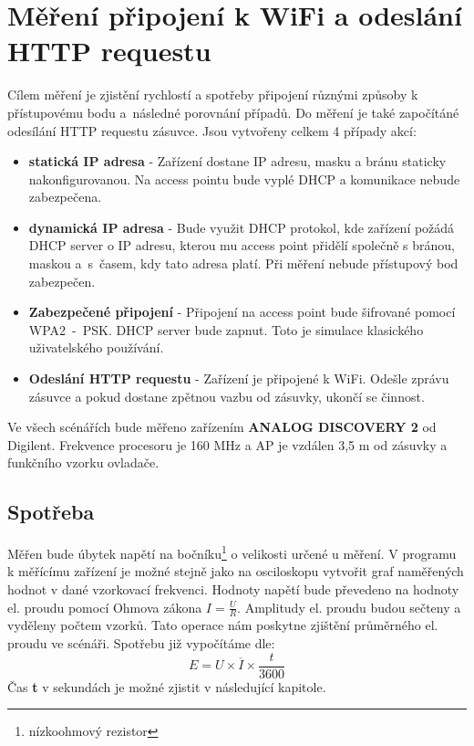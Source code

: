 \documentclass[a4paper, 12pt]{report}
\begin{document}
    \section{Měření připojení k WiFi a odeslání HTTP requestu}
    \label{sec:wifi}
    Cílem měření je zjistění rychlostí a spotřeby připojení různými způsoby k přístupovému bodu a~následné porovnání případů.
    Do měření je také započítáné odesílání HTTP requestu zásuvce.
    Jsou vytvořeny celkem 4 případy akcí:
    \begin{itemize}
        \item \textbf{statická IP adresa} - Zařízení dostane IP adresu, masku a bránu staticky nakonfigurovanou.
        Na access pointu bude vyplé DHCP a komunikace nebude zabezpečena.
        \item \textbf{dynamická IP adresa} - Bude využit DHCP protokol, kde zařízení požádá DHCP server o IP adresu, kterou mu access point přidělí společně s bránou, maskou a~s~časem, kdy tato adresa platí.
        Při měření nebude přístupový bod zabezpečen.
        \item \textbf{Zabezpečené připojení} - Připojení na access point bude šifrované pomocí WPA2~-~PSK. DHCP server bude zapnut.
        Toto je simulace klasického uživatelského používání.
        \item \textbf{Odeslání HTTP requestu} - Zařízení je připojené k WiFi. Odešle zprávu zásuvce a pokud dostane zpětnou vazbu od zásuvky, ukončí se činnost.
    \end{itemize}
    Ve všech scénářích bude měřeno zařízením \textbf{ANALOG DISCOVERY 2} od Digilent.
    Frekvence procesoru je 160 \si{MHz} a AP je vzdálen 3,5 \si{m} od zásuvky a funkčního vzorku ovladače.

    \subsection{Spotřeba}
    \label{subsec:wifi-spotreba}
    Měřen bude úbytek napětí na bočníku\footnote{nízkoohmový rezistor} o velikosti určené u měření.
    V programu k měřícímu zařízení je možné stejně jako na osciloskopu vytvořit graf naměřených hodnot v dané vzorkovací frekvenci.
    Hodnoty napětí bude převedeno na hodnoty el. proudu pomocí Ohmova zákona $I = \frac{U}{R}$.
    Amplitudy el. proudu budou sečteny a vyděleny počtem vzorků.
    Tato operace nám poskytne zjištění průměrného el. proudu ve scénáři.
    Spotřebu již vypočítáme dle:
    \[E = U \times \overline{I} \times \frac{t}{3600}\]
    Čas \textbf{t} v sekundách je možné zjistit v následující kapitole.
\end{document}
